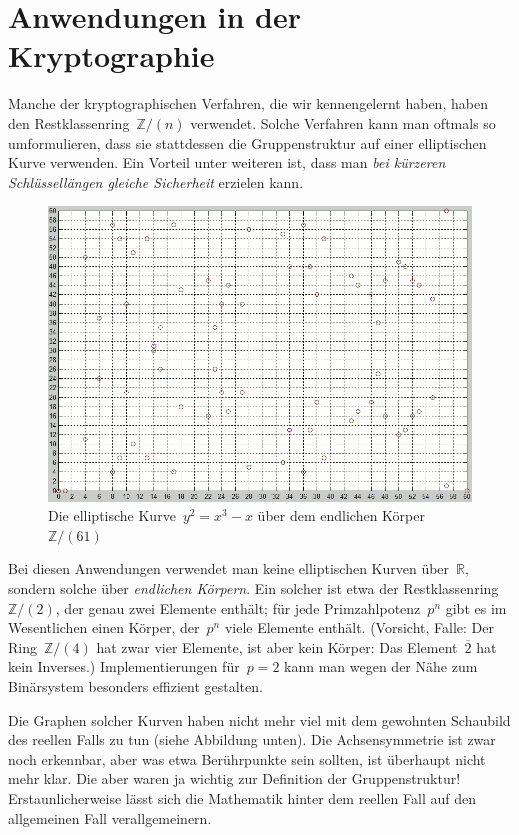 \documentclass{zirkelblatt}
\newcommand{\head}[1]{\section*{\rmfamily #1}}%
\newcommand{\ol}[1]{\ensuremath{\overline{#1}}}
\newcommand{\ZZ}{\mathbb{Z}}
\newcommand{\RR}{\mathbb{R}}
\begin{document}
\head{Anwendungen in der Kryptographie}

Manche der kryptographischen Verfahren, die wir kennengelernt haben, haben den
Restklassenring~$\ZZ/(n)$ verwendet. Solche Verfahren kann man oftmals so
umformulieren, dass sie stattdessen die Gruppenstruktur auf einer elliptischen
Kurve verwenden. Ein Vorteil unter weiteren ist, dass man \emph{bei kürzeren
Schlüssellängen gleiche Sicherheit} erzielen kann.

\begin{figure}[b!]
  \centering
  \includegraphics[scale=0.4]{elliptic-curve-z61}
  \caption{Die elliptische Kurve~$y^2 = x^3 - x$ über dem endlichen
  Körper~$\ZZ/(61)$}
\end{figure}

Bei diesen Anwendungen verwendet man keine elliptischen Kurven über~$\RR$,
sondern solche über \emph{endlichen Körpern}. Ein solcher ist etwa der
Restklassenring~$\ZZ/(2)$, der genau zwei Elemente enthält; für jede
Primzahlpotenz~$p^n$ gibt es im Wesentlichen einen Körper, der~$p^n$ viele
Elemente enthält. (Vorsicht, Falle: Der Ring~$\ZZ/(4)$ hat zwar vier
Elemente, ist aber kein Körper: Das Element~$\ol{2}$ hat kein Inverses.)
Implementierungen für~$p = 2$ kann man wegen der Nähe zum Binärsystem besonders
effizient gestalten.

Die Graphen solcher Kurven haben nicht mehr viel mit dem
gewohnten Schaubild des reellen Falls zu tun (siehe Abbildung unten). Die
Achsensymmetrie ist zwar noch erkennbar, aber was etwa Berührpunkte sein
sollten, ist überhaupt nicht mehr klar. Die aber waren ja wichtig zur
Definition der Gruppenstruktur! Erstaunlicherweise lässt sich die Mathematik
hinter dem reellen Fall auf den allgemeinen Fall verallgemeinern.
\end{document}
